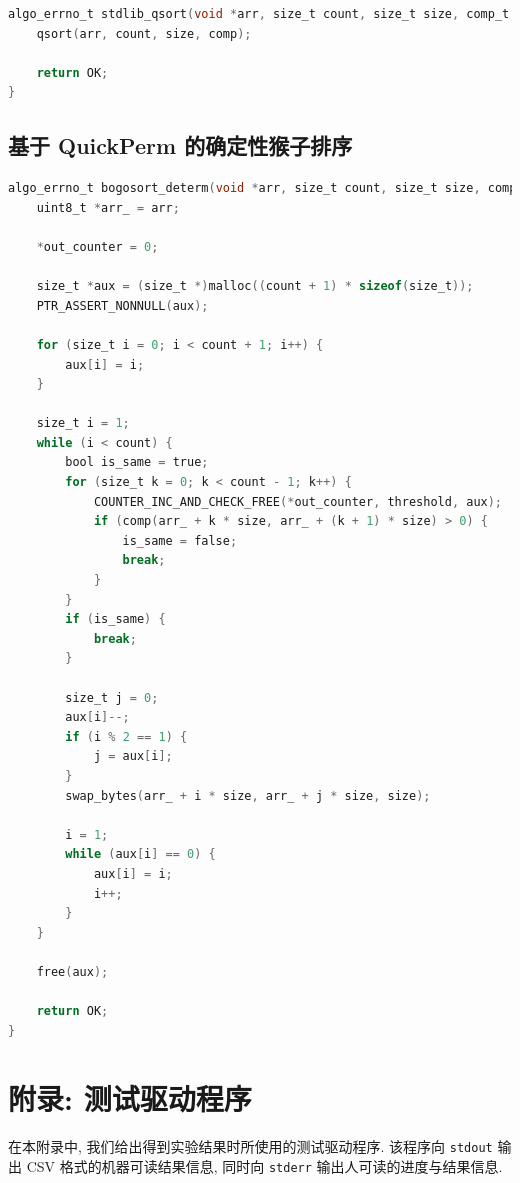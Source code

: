 \documentclass[12pt]{article}
\begin{document}
\begin{lstlisting}[language=C]
algo_errno_t stdlib_qsort(void *arr, size_t count, size_t size, comp_t comp, uint64_t threshold, uint64_t *out_counter) {
    qsort(arr, count, size, comp);

    return OK;
}
\end{lstlisting}

\subsection{基于 QuickPerm 的确定性猴子排序}

\begin{lstlisting}[language=C]
algo_errno_t bogosort_determ(void *arr, size_t count, size_t size, comp_t comp, uint64_t threshold, uint64_t *out_counter) {
    uint8_t *arr_ = arr;

    *out_counter = 0;

    size_t *aux = (size_t *)malloc((count + 1) * sizeof(size_t));
    PTR_ASSERT_NONNULL(aux);

    for (size_t i = 0; i < count + 1; i++) {
        aux[i] = i;
    }

    size_t i = 1;
    while (i < count) {
        bool is_same = true;
        for (size_t k = 0; k < count - 1; k++) {
            COUNTER_INC_AND_CHECK_FREE(*out_counter, threshold, aux);
            if (comp(arr_ + k * size, arr_ + (k + 1) * size) > 0) {
                is_same = false;
                break;
            }
        }
        if (is_same) {
            break;
        }

        size_t j = 0;
        aux[i]--;
        if (i % 2 == 1) {
            j = aux[i];
        }
        swap_bytes(arr_ + i * size, arr_ + j * size, size);

        i = 1;
        while (aux[i] == 0) {
            aux[i] = i;
            i++;
        }
    }

    free(aux);

    return OK;
}
\end{lstlisting}

\section{附录: 测试驱动程序}

在本附录中, 我们给出得到实验结果时所使用的测试驱动程序. 该程序向 \texttt{stdout} 输出 CSV 格式的机器可读结果信息, 同时向 \texttt{stderr} 输出人可读的进度与结果信息.
\end{document}
